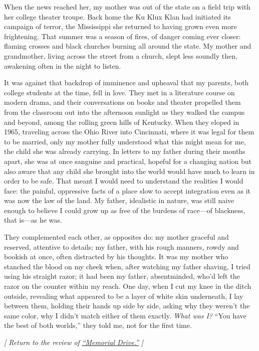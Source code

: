 When the news reached her, my mother was out of the state on a field
trip with her college theater troupe. Back home the Ku Klux Klan had
initiated its campaign of terror, the Mississippi she returned to having
grown even more frightening. That summer was a season of fires, of
danger coming ever closer: flaming crosses and black churches burning
all around the state. My mother and grandmother, living across the
street from a church, slept less soundly then, awakening often in the
night to listen.

It was against that backdrop of imminence and upheaval that my parents,
both college students at the time, fell in love. They met in a
literature course on modern drama, and their conversations on books and
theater propelled them from the classroom out into the afternoon
sunlight as they walked the campus and beyond, among the rolling green
hills of Kentucky. When they eloped in 1965, traveling across the Ohio
River into Cincinnati, where it was legal for them to be married, only
my mother fully understood what this might mean for me, the child she
was already carrying. In letters to my father during their months apart,
she was at once sanguine and practical, hopeful for a changing nation
but also aware that any child she brought into the world would have much
to learn in order to be safe. That meant I would need to understand the
realities I would face: the painful, oppressive facts of a place slow to
accept integration even as it was now the law of the land. My father,
idealistic in nature, was still naive enough to believe I could grow up
as free of the burdens of race---of blackness, that is---as he was.

They complemented each other, as opposites do: my mother graceful and
reserved, attentive to details; my father, with his rough manners, rowdy
and bookish at once, often distracted by his thoughts. It was my mother
who stanched the blood on my cheek when, after watching my father
shaving, I tried using his straight razor; it had been my father,
absentminded, who'd left the razor on the counter within my reach. One
day, when I cut my knee in the ditch outside, revealing what appeared to
be a layer of white skin underneath, I lay between them, holding their
hands up side by side, asking why they weren't the same color, why I
didn't match either of them exactly. \emph{What was I?} ``You have the
best of both worlds,'' they told me, not for the first time.

\emph{{[} Return to the review of}
\href{https://www.nytimes3xbfgragh.onion/2020/07/30/books/review/memorial-drive-natastha-trethewey.html}{\emph{``Memorial
Drive.''}} \emph{{]}}

